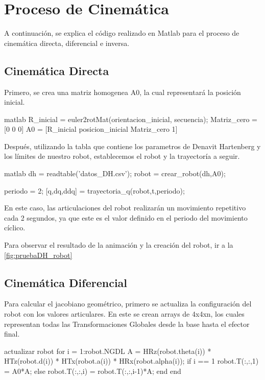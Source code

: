 \section{Proceso de Cinemática} \label{sec:proceso_cinematica}

A continuación, se explica el código realizado en Matlab para el proceso de cinemática directa, diferencial e inversa. 

\subsection{Cinemática Directa}
Primero, se crea una matriz homogenea A0, la cual representará la posición inicial. 
\begin{matlabcode}{matlab}
	R_inicial = euler2rotMat(orientacion_inicial, secuencia);
    Matriz_cero = [0 0 0]
    A0 = [R_inicial posicion_inicial
    Matriz_cero 1]
\end{matlabcode}

Después, utilizando la tabla que contiene los parametros de Denavit Hartenberg y los límites de nuestro robot, establecemos el robot y la trayectoría a seguir.

\begin{matlabcode}{matlab}
	dh = readtable('datos\tabla_DH\robotFinal.csv');
    robot = crear_robot(dh,A0);

    periodo = 2;    %
    [q,dq,ddq] = trayectoria_q(robot,t,periodo);
\end{matlabcode}
En este caso, las articulaciones del robot realizarán un movimiento repetitivo cada 2 segundos, ya que este es el valor definido en el periodo del movimiento cíclico.

Para observar el resultado de la animación y la creación del robot, ir a la \autoref{fig:pruebaDH_robot}


\subsection{Cinemática Diferencial}

Para calcular el jacobiano geométrico, primero se actualiza la configuración del robot con los valores articulares. En este se crean arrays de 4x4xn, los cuales representan todas las Transformaciones Globales desde la base hasta el efector final.

\begin{matlabcode}{actualizar robot}
	for i = 1:robot.NGDL
        A = HRz(robot.theta(i)) * HTz(robot.d(i)) * HTx(robot.a(i)) * HRx(robot.alpha(i));
        if i == 1
            robot.T(:,:,1) = A0*A;
        else
            robot.T(:,:,i) = robot.T(:,:,i-1)*A;
    end
end
\end{matlabcode}

